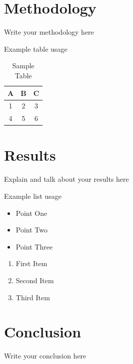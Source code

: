 \documentclass[12pt, letterpaper]{article}
\begin{document}
\section{Methodology}
Write your methodology here

Example table usage
\begin{table}[H]
    \centering
    \begin{tabular}{|c|c|c|}
        \hline
        A & B & C \\ \hline
        1 & 2 & 3 \\ \hline
        4 & 5 & 6 \\ \hline
    \end{tabular}
    \caption{Sample Table}
    \label{tbl:sample}
\end{table}



\section{Results}
Explain and talk about your results here

Example list usage

    \begin{itemize}
        \item Point One
        \item Point Two
        \item Point Three
    \end{itemize}
    
    \begin{enumerate}
        \item First Item
        \item Second Item
        \item Third Item
    \end{enumerate}

\section{Conclusion}
Write your conclusion here




\end{document}
